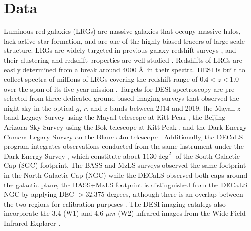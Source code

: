 \section{Data}
\label{sec:data}
Luminous red galaxies (LRGs) are massive galaxies that occupy massive halos, lack active star formation, and are one of the highly biased tracers of large-scale structure. LRGs are widely targeted in previous galaxy redshift surveys \citep[see, e.g.,][]{eisenstein2001spectroscopic, prakash2016sdss}, and their clustering and redshift properties are well studied \citep[see, e.g.,][]{alam2021completed}. Redshifts of LRGs are easily determined from a break around 4000 \AA~in their spectra. DESI is built to collect spectra of millions of LRGs covering the redshift range of $0.4<z<1.0$ over the span of its five-year mission \citep{aghamousa2016desi}. Targets for DESI spectroscopy are pre-selected from three dedicated ground-based imaging surveys that observed the night sky in the optical $g$, $r$, and $z$ bands between 2014 and 2019: the Mayall $z$-band Legacy Survey using the Mayall telescope at Kitt Peak \citep[MzLS;][]{dey2018overview}, the Beijing–Arizona Sky Survey using the Bok telescope at Kitt Peak \citep[BASS;][]{zou2017project}, and the Dark Energy Camera Legacy Survey on the Blanco 4m telescope \citep[DECaLS][]{flaugher2015dark}. Additionally, the DECaLS program integrates observations conducted from the same instrument under the Dark Energy Survey \citep{abbott2016dark}, which constitute about $1130 \deg^{2}$ of the South Galactic Cap (SGC) footprint. The BASS and MzLS surveys observed the same footprint in the North Galactic Cap (NGC) while the DECaLS observed both caps around the galactic plane; the BASS+MzLS footprint is distinguished from the DECaLS NGC by applying DEC $> 32.375$ degrees, although there is an overlap between the two regions for calibration purposes \citep{dey2018overview}. The DESI imaging catalogs also incorporate the $3.4$ (W1) and $4.6$ $\mu m$ (W2) infrared images from the Wide-Field Infrared Explorer \citep[WISE;][]{wise2010AJ....140.1868W}. 

